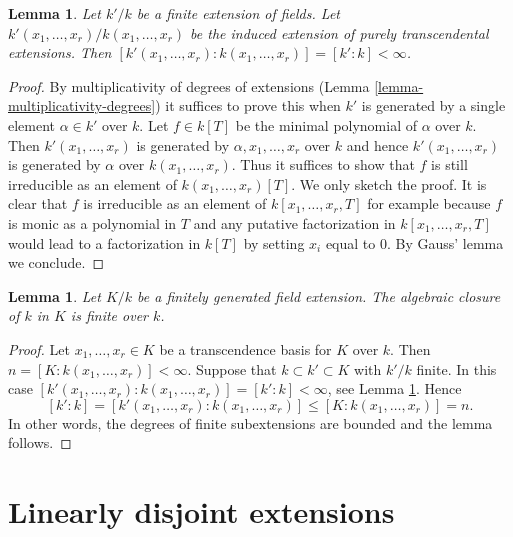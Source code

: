 \documentclass{stacks-project}
\theoremstyle{plain}
\newtheorem{lemma}[subsection]{Lemma}
\theoremstyle{definition}
\theoremstyle{remark}
\numberwithin{equation}{subsection}
\begin{document}
\begin{lemma}
\label{lemma-purely-transcendental-degree}
Let $k'/k$ be a finite extension of fields. Let
$k'(x_1, \ldots, x_r)/k(x_1, \ldots, x_r)$ be the
induced extension of purely transcendental extensions.
Then $[k'(x_1, \ldots, x_r) : k(x_1, \ldots, x_r)] = [k' : k] < \infty$.
\end{lemma}

\begin{proof}
By multiplicativity of degrees of extensions
(Lemma \ref{lemma-multiplicativity-degrees})
it suffices to prove this when $k'$ is generated by a single element
$\alpha \in k'$ over $k$. Let $f \in k[T]$ be the minimal polynomial
of $\alpha$ over $k$. Then $k'(x_1, \ldots, x_r)$ is generated
by $\alpha, x_1, \ldots, x_r$ over $k$ and hence $k'(x_1, \ldots, x_r)$
is generated by $\alpha$ over $k(x_1, \ldots, x_r)$.
Thus it suffices to show that $f$ is still irreducible as
an element of $k(x_1, \ldots, x_r)[T]$. We only sketch the proof.
It is clear that $f$ is irreducible as an element of
$k[x_1, \ldots, x_r, T]$ for example because $f$ is monic
as a polynomial in $T$ and any putative factorization in
$k[x_1, \ldots, x_r, T]$ would lead to a factorization in $k[T]$
by setting $x_i$ equal to $0$. By Gauss' lemma we conclude.
\end{proof}

\begin{lemma}
\label{lemma-algebraic-closure-in-finitely-generated}
Let $K/k$ be a finitely generated field extension.
The algebraic closure of $k$ in $K$ is finite over $k$.
\end{lemma}

\begin{proof}
Let $x_1, \ldots, x_r \in K$ be a transcendence basis for $K$
over $k$. Then $n = [K : k(x_1, \ldots, x_r)] < \infty$.
Suppose that $k \subset k' \subset K$ with $k'/k$ finite.
In this case
$[k'(x_1, \ldots, x_r) : k(x_1, \ldots, x_r)] = [k' : k] < \infty$, see
Lemma \ref{lemma-purely-transcendental-degree}.
Hence
$$
[k' : k] = [k'(x_1, \ldots, x_r) : k(x_1, \ldots, x_r)] \leq
[K : k(x_1, \ldots, x_r)] = n.
$$
In other words, the degrees of finite subextensions are bounded
and the lemma follows.
\end{proof}






\section{Linearly disjoint extensions}
\label{section-linearly-disjoint}
\end{document}
